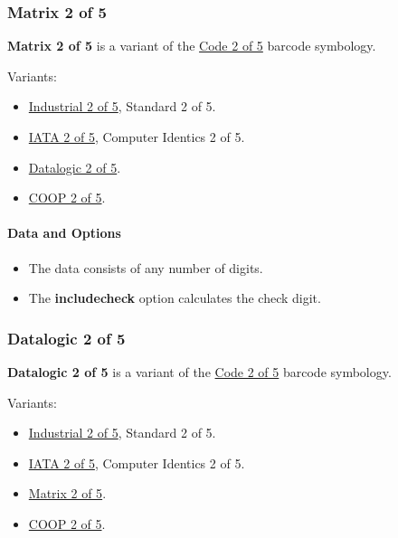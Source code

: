 \hypertarget{matrix-2-of-5}{%
\subsubsection{Matrix 2 of 5}\label{matrix-2-of-5}}

\textbf{Matrix 2 of 5} is a variant of the
\protect\hyperlink{code-25}{Code 2 of 5} barcode symbology.

Variants:

\begin{itemize}
\tightlist
\item
  \protect\hyperlink{code-25}{Industrial 2 of 5}, Standard 2 of 5.
\item
  \protect\hyperlink{iata-2-of-5}{IATA 2 of 5}, Computer Identics 2 of
  5.
\item
  \protect\hyperlink{datalogic-2-of-5}{Datalogic 2 of 5}.
\item
  \protect\hyperlink{coop-2-of-5}{COOP 2 of 5}.
\end{itemize}

\hypertarget{data-and-options-69}{%
\paragraph{Data and Options}\label{data-and-options-69}}

\begin{itemize}
\tightlist
\item
  The data consists of any number of digits.
\item
  The \textbf{includecheck} option calculates the check digit.
\end{itemize}

\hypertarget{datalogic-2-of-5}{%
\subsubsection{Datalogic 2 of 5}\label{datalogic-2-of-5}}

\textbf{Datalogic 2 of 5} is a variant of the
\protect\hyperlink{code-25}{Code 2 of 5} barcode symbology.

Variants:

\begin{itemize}
\tightlist
\item
  \protect\hyperlink{code-25}{Industrial 2 of 5}, Standard 2 of 5.
\item
  \protect\hyperlink{iata-2-of-5}{IATA 2 of 5}, Computer Identics 2 of
  5.
\item
  \protect\hyperlink{matrix-2-of-5}{Matrix 2 of 5}.
\item
  \protect\hyperlink{coop-2-of-5}{COOP 2 of 5}.
\end{itemize}

